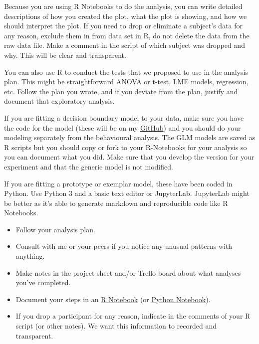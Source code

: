 \documentclass{article}
\begin{document}
Because you are using R Notebooks to do the analysis, you can write detailed descriptions of how you created the plot, what the plot is showing, and how we should interpret the plot. If you need to drop or eliminate a subject's data for any reason, exclude them in from data set in R, do not delete the data from the raw data file. Make a comment in the script of which subject was dropped and why. This will be clear and transparent.

You can also use R to conduct the tests that we proposed to use in the analysis plan. This might be straightforward ANOVA or t-test, LME models, regression, etc. Follow the plan you wrote, and if you deviate from the plan, justify and document that exploratory analysis.

If you are fitting a decision boundary model to your data, make sure you have the code for the model (these will be on my \href{https://github.com/jpminda}{GitHub}) and you should do your modeling separately from the behavioural analysis. The GLM models are saved as R scripts but you should copy or fork to your R-Notebooks for your analysis so you can document what you did. Make sure that you develop the version for your experiment and that the generic model is not modified. 

If you are fitting a prototype or exemplar model, these have been coded in Python. Use Python 3 and a basic text editor or JupyterLab. JupyterLab might be better as it's able to generate markdown and reproducible code like R Notebooks.

\begin{itemize}
    \item Follow your analysis plan.
    \item Consult with me or your peers if you notice any unusual patterns with anything.
    \item Make notes in the project sheet and/or Trello board about what analyses you've completed. 
    \item Document your steps in an \href{https://www.rstudio.com/}{R Notebook} (or \href{https://jupyter.org/}{Python Notebook}). 
    \item If you drop a participant for any reason, indicate in the comments of your R script (or other notes). We want this information to recorded and transparent. 

\end{itemize}
\end{document}

